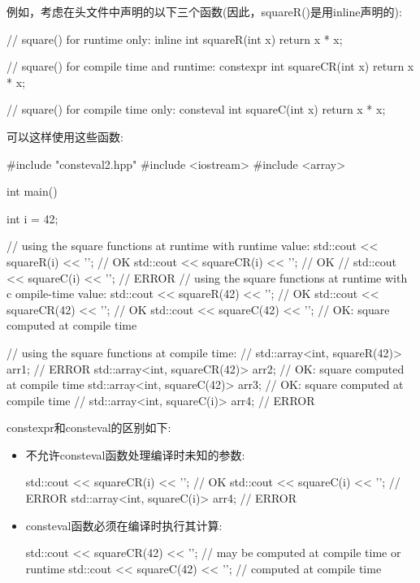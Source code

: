 例如，考虑在头文件中声明的以下三个函数(因此，squareR()是用inline声明的):


\begin{cpp}
// square() for runtime only:
inline int squareR(int x) {
	return x * x;
}

// square() for compile time and runtime:
constexpr int squareCR(int x) {
	return x * x;
}

// square() for compile time only:
consteval int squareC(int x) {
	return x * x;
}
\end{cpp}

可以这样使用这些函数:


\begin{cpp}
#include "consteval2.hpp"
#include <iostream>
#include <array>

int main()
{
	int i = 42;

	// using the square functions at runtime with runtime value:
	std::cout << squareR(i) << '\n'; // OK
	std::cout << squareCR(i) << '\n'; // OK
	// std::cout << squareC(i) << ’’; // ERROR
	// using the square functions at runtime with c
	ompile-time value:
	std::cout << squareR(42) << '\n'; // OK
	std::cout << squareCR(42) << '\n'; // OK
	std::cout << squareC(42) << '\n'; // OK: square computed at compile time

	// using the square functions at compile time:
	// std::array<int, squareR(42)> arr1; // ERROR
	std::array<int, squareCR(42)> arr2; // OK: square computed at compile time
	std::array<int, squareC(42)> arr3; // OK: square computed at compile time
	// std::array<int, squareC(i)> arr4; // ERROR
}
\end{cpp}

constexpr和consteval的区别如下:

\begin{itemize}
\item
不允许consteval函数处理编译时未知的参数:

\begin{cpp}
std::cout << squareCR(i) << '\n'; // OK
std::cout << squareC(i) << '\n'; // ERROR
std::array<int, squareC(i)> arr4; // ERROR
\end{cpp}

\item
consteval函数必须在编译时执行其计算:

\begin{cpp}
std::cout << squareCR(42) << '\n'; // may be computed at compile time or runtime
std::cout << squareC(42) << '\n'; // computed at compile time
\end{cpp}

\end{itemize}

